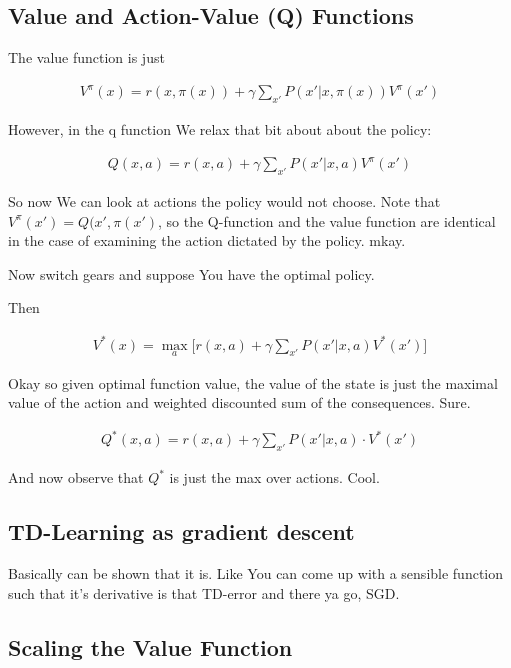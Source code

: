 \documentclass{article}
\begin{document}
	\subsection{Value and Action-Value (Q) Functions}
	
		The value function is just 
		
		\begin{align}
			V^{\pi}(x) = r(x, \pi(x)) + \gamma\sum_{x'} P(x'|x, \pi(x))V^{\pi}(x')
		\end{align}
		
		However, in the q function We relax that bit about about the policy:
		
		\begin{align}
			Q(x, a) = r(x, a) + \gamma\sum_{x'} P(x'|x, a)V^\pi(x')
		\end{align}
		
		So now We can look at actions the policy would not choose. Note that $V^\pi(x') = Q(x', \pi(x')$, so the Q-function and the value function are identical in the case of examining the action dictated by the policy. mkay.
		
		Now switch gears and suppose You have the optimal policy.
		
		Then
		
		\begin{align}
			V^*(x) = \max_{a} \bigg[ r(x, a) + \gamma \sum_{x'} P(x'|x, a)V^*(x')   \bigg]
		\end{align}
		
		Okay so given optimal function value, the value of the state is just the maximal value of the action and weighted discounted sum of the consequences. Sure.
		
		\begin{align}
			Q^*(x, a) = r(x, a) + \gamma\sum_{x'} P(x'|x, a)\cdot V^*(x')
		\end{align}
		
		And now observe that $Q^*$ is just the max over actions. Cool.
		
	\subsection{TD-Learning as gradient descent}
	
		Basically can be shown that it is. Like You can come up with a sensible function such that it's derivative is that TD-error and there ya go, SGD.
		
	\subsection{Scaling the Value Function}
	
\end{document}
